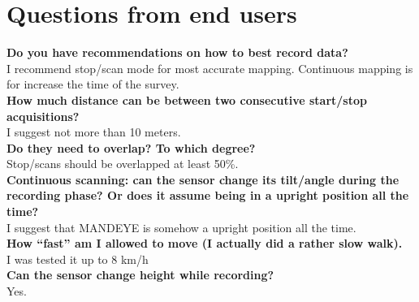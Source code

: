 \chapter{Questions from end users}

\textbf{Do you have recommendations on how to best record data?} \\
I recommend stop/scan mode for most accurate mapping.
Continuous mapping is for increase the time of the survey.  \\
\textbf{How much distance can be between two consecutive start/stop acquisitions?}\\
I suggest not more than 10 meters.\\
\textbf{Do they need to overlap? To which degree?}\\
Stop/scans should be overlapped at least 50\%.\\
\textbf{Continuous scanning: can the sensor change its tilt/angle during the recording phase? 
Or does it assume being in a upright position all the time?} \\
I suggest that MANDEYE  is somehow a upright position all the time. \\
\textbf{How “fast” am I allowed to move (I actually did a rather slow walk).} \\
I was tested it up to 8 km/h\\
\textbf{Can the sensor change height while recording?}\\
Yes.
